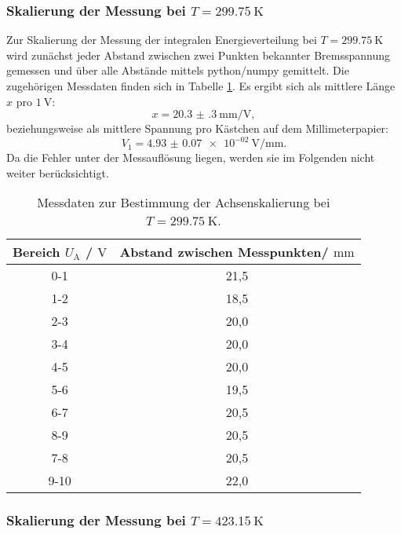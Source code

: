 \subsubsection{Skalierung der Messung bei $T=\SI{299.75}{\kelvin}$}
Zur Skalierung der Messung der integralen Energieverteilung bei $T=\SI{299.75}{\kelvin}$ wird zunächst jeder Abstand zwischen zwei Punkten bekannter Bremsspannung gemessen und über alle Abstände mittels python/numpy \cite{numpy} gemittelt.
Die zugehörigen Messdaten finden sich in Tabelle \ref{tab:skalaa}.
Es ergibt sich als mittlere Länge $x$ pro $\SI{1}{\volt}$:
\begin{equation}
	x=\SI{20.3(3)}{\milli\meter\per\volt} \mathrm{,}
\end{equation}
beziehungsweise als mittlere Spannung pro Kästchen auf dem Millimeterpapier:
\begin{equation}
	V_1= \SI{4.93(7)e-02}{\volt\per\milli\meter} \mathrm{.}
\end{equation}
Da die Fehler unter der Messauflösung liegen, werden sie im Folgenden nicht weiter berücksichtigt.
\begin{table}
	\centering
	\caption{Messdaten zur Bestimmung der Achsenskalierung bei $T=\SI{299.75}{\kelvin}$.}
	\label{tab:skalaa}
	\begin{tabular}{cc}
		\toprule
		Bereich $U_{\mathrm{A}}$ / $\si{\volt}$ & Abstand zwischen Messpunkten/ $\si{\milli\meter}$ \\
		\midrule
		0-1 & 21,5 \\
		1-2 & 18,5 \\
		2-3 & 20,0 \\
		3-4 & 20,0 \\
		4-5 & 20,0 \\
		5-6 & 19,5 \\
		6-7 & 20,5 \\
		8-9 & 20,5 \\
		7-8 & 20,5 \\
		9-10 & 22,0 \\
		\bottomrule
	\end{tabular}
\end{table}


\subsubsection{Skalierung der Messung bei $T=\SI{423.15}{\kelvin}$}%

